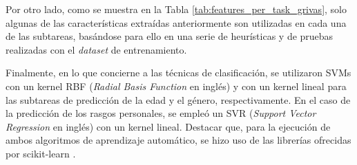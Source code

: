 \bigskip
Por otro lado, como se muestra en la Tabla \ref{tab:features_per_task_grivas}, solo algunas de las características extraídas anteriormente son utilizadas en cada una de las subtareas, basándose
para ello en una serie de heurísticas y de pruebas realizadas con el \textit{dataset} de entrenamiento.

\bigskip
\begin{table}[H]
	\centering
	\caption{Características extraídas en el algoritmo de Grivas et al. \cite{grivas2015author}}
	\label{tab:features_per_task_grivas}
\end{table}

\bigskip
Finalmente, en lo que concierne a las técnicas de clasificación, se utilizaron SVMs con un kernel RBF (\textit{Radial Basis Function} en inglés) y con un kernel lineal
para las subtareas de predicción de la edad y el género, respectivamente. En el caso de la predicción de los rasgos personales, se empleó un SVR (\textit{Support Vector Regression} en inglés)
con un kernel lineal. Destacar que, para la ejecución de ambos algoritmos de aprendizaje automático, se hizo uso de las librerías ofrecidas por scikit-learn \cite{scikitlearn}.

